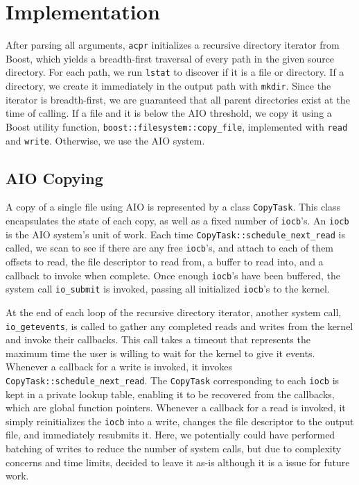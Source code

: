 \documentclass[11pt]{article}
\begin{document}
\section{Implementation} \label{sec:impl}

After parsing all arguments, \texttt{acpr} initializes a recursive directory
iterator from Boost, which yields a breadth-first traversal of every path in the
given source directory. For each path, we run \texttt{lstat} to discover if it
is a file or directory. If a directory, we create it immediately in the output
path with \texttt{mkdir}. Since the iterator is breadth-first, we are guaranteed
that all parent directories exist at the time of calling. If a file and it is
below the AIO threshold, we copy it using a Boost utility function,
\texttt{boost::filesystem::copy\_file}, implemented with \texttt{read} and
\texttt{write}. Otherwise, we use the AIO system.

\subsection{AIO Copying} \label{sec:aio_copy}

A copy of a single file using AIO is represented by a class \texttt{CopyTask}.
This class encapsulates the state of each copy, as well as a fixed number of
\texttt{iocb}'s. An \texttt{iocb} is the AIO system's unit of work. Each time
\texttt{CopyTask::schedule\_next\_read} is called, we scan to see if there are
any free \texttt{iocb}'s, and attach to each of them offsets to read, the file
descriptor to read from, a buffer to read into, and a callback to invoke when
complete. Once enough \texttt{iocb}'s have been buffered, the system call
\texttt{io\_submit} is invoked, passing all initialized \texttt{iocb}'s to the
kernel. 

At the end of each loop of the recursive directory iterator, another system
call, \texttt{io\_getevents}, is called to gather any completed reads and writes
from the kernel and invoke their callbacks. This call takes a timeout that
represents the maximum time the user is willing to wait for the kernel to give
it events. Whenever a callback for a write is invoked, it invokes
\texttt{CopyTask::schedule\_next\_read}. The \texttt{CopyTask} corresponding to
each \texttt{iocb} is kept in a private lookup table, enabling it to be
recovered from the callbacks, which are global function pointers. Whenever a
callback for a read is invoked, it simply reinitializes the \texttt{iocb} into a
write, changes the file descriptor to the output file, and immediately resubmits
it. Here, we potentially could have performed batching of writes to reduce the
number of system calls, but due to complexity concerns and time limits, decided
to leave it as-is although it is a issue for future work.
\end{document}
